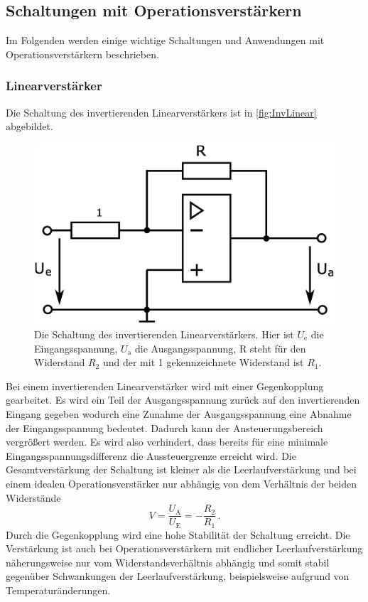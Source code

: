 \newpage
\subsection{Schaltungen mit Operationsverstärkern}
\label{sec:Schaltungen}

Im Folgenden werden einige wichtige Schaltungen und Anwendungen mit Operationsverstärkern beschrieben.

\subsubsection{Linearverstärker}
\label{sec:linearverstaerker}
Die Schaltung des invertierenden Linearverstärkers ist in \autoref{fig:InvLinear} abgebildet.

\begin{figure}
    \centering
    \includegraphics[width=0.7\linewidth]{./figures/1_InvLinear.png}
    \caption{Die Schaltung des invertierenden Linearverstärkers. Hier ist $U_\text{e}$ die Eingangsspannung, $U_\text{a}$ die Ausgangsspannung, R steht für den Widerstand $R_2$ und der mit 1 gekennzeichnete Widerstand ist $R_1$. \cite{V51}}
    \label{fig:InvLinear}
\end{figure}

Bei einem invertierenden Linearverstärker wird mit einer Gegenkopplung gearbeitet. Es wird ein Teil der Ausgangsspannung zurück auf den invertierenden Eingang gegeben wodurch eine Zunahme der Ausgangsspannung eine Abnahme der Eingangsspannung bedeutet. Dadurch kann der Ansteuerungsbereich vergrößert werden. Es wird also verhindert, dass bereits für eine minimale Eingangsspannungsdifferenz die Aussteuergrenze erreicht wird. Die Gesamtverstärkung der Schaltung ist kleiner als die Leerlaufverstärkung und bei einem idealen Operationsverstärker nur abhängig von dem Verhältnis der beiden Widerstände
\begin{equation*}
    V = \frac{U_\text{A}}{U_\text{E}} = - \frac{R_2}{R_1} \, .
\end{equation*}
Durch die Gegenkopplung wird eine hohe Stabilität der Schaltung erreicht. Die Verstärkung ist auch bei Operationsverstärkern mit endlicher Leerlaufverstärkung näherungsweise nur vom Widerstandsverhältnis abhängig und somit stabil gegenüber Schwankungen der Leerlaufverstärkung, beispielsweise aufgrund von Temperaturänderungen.

